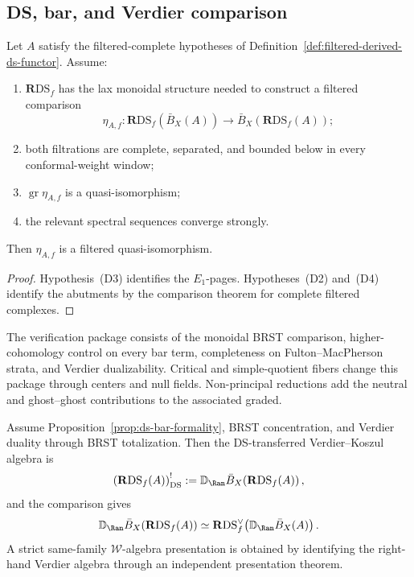\subsection{DS, bar, and Verdier comparison}
\label{sec:ds-bar-comparison-deep}
\label{sec:ds-bar-intertwining}

\begin{proposition}
\label{prop:ds-bar-formality}
\ClaimStatusConditional
Let \(A\) satisfy the filtered-complete hypotheses of
Definition~\ref{def:filtered-derived-ds-functor}.  Assume:
\begin{enumerate}[label=\textup{(D\arabic*)}]
\item \(\mathbf R\mathrm{DS}_f\) has the lax monoidal structure needed
  to construct a filtered comparison
  \[
  \eta_{A,f}\colon
  \mathbf R\mathrm{DS}_f\!\left(\bar B_X(A)\right)
  \longrightarrow
  \bar B_X\!\left(\mathbf R\mathrm{DS}_f(A)\right);
  \]
\item both filtrations are complete, separated, and bounded below in
  every conformal-weight window;
\item \(\operatorname{gr}\eta_{A,f}\) is a quasi-isomorphism;
\item the relevant spectral sequences converge strongly.
\end{enumerate}
Then \(\eta_{A,f}\) is a filtered quasi-isomorphism.
\end{proposition}

\begin{proof}
Hypothesis~\textup{(D3)} identifies the \(E_1\)-pages.
Hypotheses~\textup{(D2)} and~\textup{(D4)} identify the abutments by
the comparison theorem for complete filtered complexes.
\end{proof}

\begin{remark}
\label{rem:ds-bar-verdier-obstructions}
The verification package consists of the monoidal BRST comparison,
higher-cohomology control on every bar term, completeness on
Fulton--MacPherson strata, and Verdier dualizability.  Critical and
simple-quotient fibers change this package
through centers and null fields.  Non-principal reductions add the
neutral and ghost--ghost contributions to the associated graded.
\end{remark}

\begin{proposition}
\label{prop:ds-transferred-koszul-dual}
\ClaimStatusConditional
Assume Proposition~\ref{prop:ds-bar-formality}, BRST concentration,
and Verdier duality through BRST totalization.  Then the
DS-transferred Verdier--Koszul algebra is
\[
\left(\mathbf R\mathrm{DS}_f(A)\right)^!_{\mathrm{DS}}
:=
\mathbb D_{\Ran}
\bar B_X\!\left(\mathbf R\mathrm{DS}_f(A)\right),
\]
and the comparison gives
\[
\mathbb D_{\Ran}\bar B_X\!\left(\mathbf R\mathrm{DS}_f(A)\right)
\simeq
\mathbf R\mathrm{DS}_f^\vee
\!\left(\mathbb D_{\Ran}\bar B_X(A)\right).
\]
A strict same-family \(\mathcal W\)-algebra presentation is obtained
by identifying the right-hand Verdier algebra through an independent
presentation theorem.
\end{proposition}

